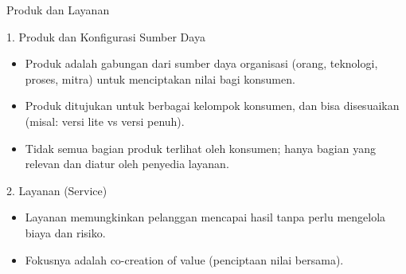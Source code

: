 \documentclass[aspectratio=179]{beamer}
\begin{document}


\begin{frame}{Produk dan Layanan}
    \begin{block}{1. Produk dan Konfigurasi Sumber Daya}
        \begin{itemize}
            \item Produk adalah gabungan dari sumber daya organisasi (orang, teknologi, proses, mitra) untuk menciptakan nilai bagi konsumen.
            \item Produk ditujukan untuk berbagai kelompok konsumen, dan bisa disesuaikan (misal: versi lite vs versi penuh).
            \item Tidak semua bagian produk terlihat oleh konsumen; hanya bagian yang relevan dan diatur oleh penyedia layanan.
        \end{itemize}
    \end{block}
    \begin{block}{2. Layanan (Service)}
        \begin{itemize}
            \item Layanan memungkinkan pelanggan mencapai hasil tanpa perlu mengelola biaya dan risiko.
            \item Fokusnya adalah co-creation of value (penciptaan nilai bersama).
        \end{itemize}
    \end{block}
\end{frame}
\end{document}
